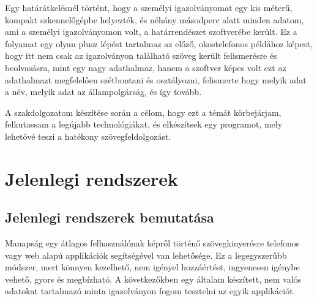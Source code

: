 \documentclass[12pt]{report}
\begin{document}
Egy határátkelésnél történt, hogy a személyi igazolványomat egy kis méterű, kompakt szkennelőgépbe helyezték, és néhány másodperc alatt minden adatom, ami a személyi igazolványomon volt, a határrendészet szoftverébe került. Ez a folyamat egy olyan plusz lépést tartalmaz az előző, okostelefonos példához képest, hogy itt nem csak az igazolványon található szöveg került felismerésre és beolvasásra, mint egy nagy adathalmaz, hanem a szoftver képes volt ezt az adathalmazt megfelelően szétbontani és osztályozni, felismerte hogy melyik adat a név, melyik adat az állampolgárság, és így tovább.

A szakdolgozatom készítése során a célom, hogy ezt a témát körbejárjam, felkutassam a legújabb technológiákat, és elkészítsek egy programot, mely lehetővé teszi a hatékony szövegfeldolgozást.



\chapter{Jelenlegi rendszerek}
\section{Jelenlegi rendszerek bemutatása}

Manapság egy átlagos felhasználónak képről történő szövegkinyerésre telefonos vagy web alapú applikációk segítségével van lehetősége. Ez a legegyszerűbb módszer, mert könnyen kezelhető, nem igényel hozzáértést, ingyenesen igénybe vehető, gyors és megbízható. A következőkben egy általam készített, nem valós adatokat tartalmazó minta igazolványon fogom tesztelni az egyik applikációt. \cite{onlineocr}
\end{document}
